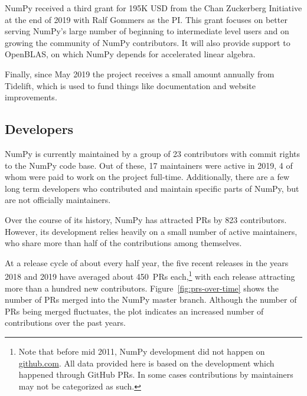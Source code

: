 \documentclass[twocolumn]{article}
\begin{document}
NumPy received a third grant for 195K USD from the Chan Zuckerberg
Initiative at the end of 2019 with Ralf Gommers as the PI.
This grant focuses on better serving NumPy's large number of beginning
to intermediate level users and on growing the community of NumPy
contributors.
It will also provide support to OpenBLAS, on which NumPy depends for
accelerated linear algebra.

Finally, since May 2019 the project receives a small amount annually from
Tidelift, which is used to fund things like documentation and website
improvements.


\subsection*{Developers}

NumPy is currently maintained by a group of 23 contributors with commit rights
to the NumPy code base. Out of these, 17 maintainers were active in
2019, 4 of whom were paid to work on the project full-time.
Additionally, there are a few long term developers who contributed and maintain
specific parts of NumPy, but are not officially maintainers.

Over the course of its history, NumPy has attracted PRs by 823 contributors.
However, its development relies heavily on a small number
of active maintainers, who share more than half of the contributions among
themselves.

At a release cycle of about every half year, the five recent releases in the years
2018 and 2019 have averaged about 450~PRs each,\footnote{
    Note that before mid 2011, NumPy development did not happen on \url{github.com}.
    All data provided here is based on the development which happened through GitHub
    PRs. In some cases contributions by maintainers may not be categorized as such.}
with each release attracting more than a hundred new contributors.
Figure~\ref{fig:prs-over-time} shows the number of PRs merged into the NumPy
master branch.
Although the number of PRs being merged fluctuates,
the plot indicates an increased number of contributions over the past
years.
\end{document}
